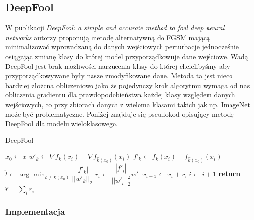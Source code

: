 \documentclass{article}
\begin{document}
\subsection{DeepFool}
W publikacji \textit{DeepFool: a simple and accurate method to fool deep neural networks}\cite{DBLP:journals/corr/Moosavi-Dezfooli15}
autorzy proponują metodę alternatywną do FGSM mającą minimalizować wprowadzaną do danych wejściowych perturbacje jednocześnie
osiągając zmianę klasy do której model przyporządkowuje dane wejściowe.
Wadą DeepFool jest brak możliwości narzucenia klasy do której chcielibyśmy aby przyporządkowywane były nasze zmodyfikowane dane.
Metoda ta jest nieco bardziej złożona obliczeniowo jako że pojedynczy krok algorytmu wymaga od nas obliczenia gradientu dla
prawdopodobieństwa każdej klasy względem danych wejściowych, co przy zbiorach danych z wieloma klasami
takich jak np. ImageNet może być problematyczne. Poniżej znajduje się pseudokod opisujący metodę DeepFool dla modelu
wieloklasowego.
\begin{algorithm}
\caption{DeepFool}\label{DeepFool}
\begin{algorithmic}[1]
\State $x_0 \gets x$
    \State $w'_k\gets \nabla f_k(x_i) - \nabla f_{\hat{k}(x_0)}(x_i)$
    \State $f'_k\gets f_{k}(x_i) - f_{\hat{k}(x_0)}(x_i)$
\EndFor
\State $\hat{l}\gets \arg \min_{k\neq\hat{k}(x_0)} \dfrac{|f'_k|}{||w'_k||_2}$
\State $r_i\gets \dfrac{|f'_{\hat{l}}|}{||w'_{\hat{l}}||^2_2}w'_{\hat{l}}$
\State $x_{i+1}\gets x_i + r_i$
\State $i\gets i + 1$
\EndWhile
\State \textbf{return} $\hat{r} = \sum_{i} r_i$
\end{algorithmic}
\end{algorithm}


\subsubsection{Implementacja}
\end{document}
